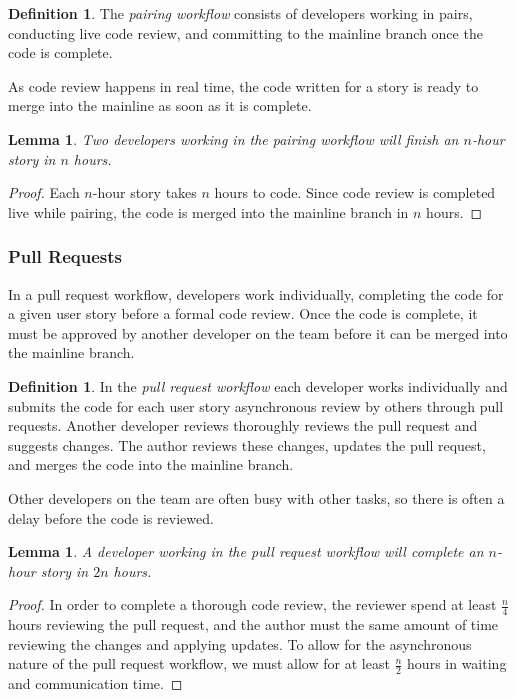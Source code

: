 \documentclass[letterpaper]{article}
\newtheorem{lemma}[theorem]{Lemma}
\theoremstyle{definition}
\newtheorem{definition}[theorem]{Definition}
\begin{document}
    \begin{definition}
        The \textit{pairing workflow} consists of developers working in pairs, conducting live code review, and
        committing to the mainline branch once the code is complete.
    \end{definition}

    As code review happens in real time, the code written for a story is ready to merge into the mainline as soon as it
    is complete.

    \begin{lemma}
        \label{lemma:pair}
        Two developers working in the pairing workflow will finish an $n$-hour story in $n$ hours.
    \end{lemma}
    \begin{proof}
        Each $n$-hour story takes $n$ hours to code.
        Since code review is completed live while pairing, the code is merged into the mainline branch in $n$ hours.
    \end{proof}

    \subsubsection{Pull Requests}\label{subsubsec:pull-requests}

    In a pull request workflow, developers work individually, completing the code for a given user story before a formal
    code review.
    Once the code is complete, it must be approved by another developer on the team before it can be merged into the
    mainline branch.

    \begin{definition}
        In the \textit{pull request workflow} each developer works individually and submits the code for each user story
        asynchronous review by others through pull requests.
        Another developer reviews thoroughly reviews the pull request and suggests changes.
        The author reviews these changes, updates the pull request, and merges the code into the mainline branch.
    \end{definition}

    Other developers on the team are often busy with other tasks, so there is often a delay before the code is reviewed.

    \begin{lemma}
        \label{lemma:solo}
        A developer working in the pull request workflow will complete an $n$-hour story in $2n$ hours.
    \end{lemma}
    \begin{proof}
        In order to complete a thorough code review, the reviewer spend at least $\frac{n}{4}$ hours reviewing the pull
        request, and the author must the same amount of time reviewing the changes and applying updates.
        To allow for the asynchronous nature of the pull request workflow, we must allow for at least $\frac{n}{2}$
        hours in waiting and communication time.
    \end{proof}
\end{document}
